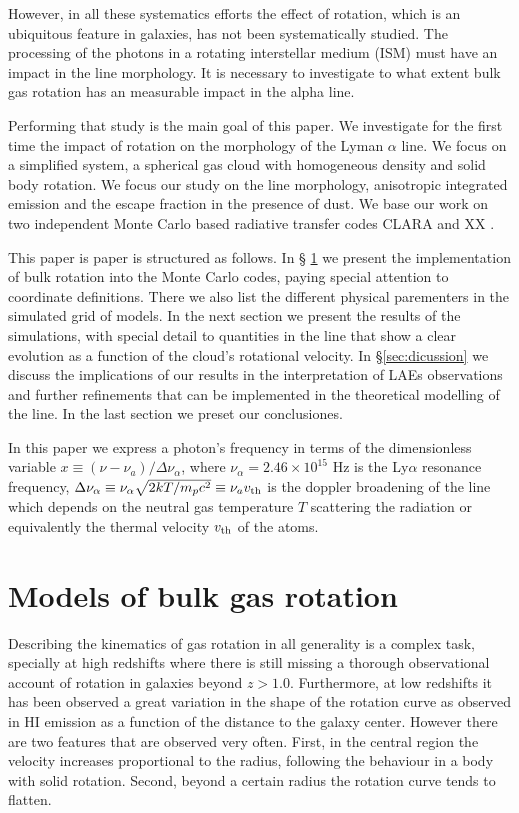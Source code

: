 \documentclass[usenatbib]{mn2e}
\newcommand{\ly}{{\ifmmode{{\rm Ly}\alpha~}\else{Ly$\alpha$~}\fi}}
\begin{document}
However, in all these systematics efforts the effect of rotation,
which is an ubiquitous feature in galaxies, has not been
systematically studied. The processing of the \ly photons in a
rotating interstellar medium (ISM) must have an impact in the line
morphology. It is necessary to investigate to what extent bulk gas
rotation has an measurable impact in the \ly alpha line. 

Performing that study is the main goal of this paper. We investigate for the
first time the impact of rotation on the morphology of the Lyman
$\alpha$ line. We focus on a simplified system, a spherical gas cloud
with homogeneous density and solid body rotation. We focus our study
on the line morphology, anisotropic integrated emission and the escape
fraction in the presence of dust. We base our work on two independent
Monte Carlo based radiative transfer codes CLARA \citep{CLARA} and XX
\citep{DijkstraKramer} .   
  
 
This paper is paper is structured as follows. In \S
\ref{sec:implementation} we present the implementation of bulk
rotation into the Monte Carlo codes, paying special attention to coordinate
definitions. There we also list the different physical parementers in
the simulated grid of models. In the next section we present the
results of the simulations, with special detail to quantities in the
line that show a clear evolution as a function of the cloud's
rotational velocity. In \S \ref{sec:dicussion} we discuss the
implications of our results in the interpretation of LAEs
observations and further refinements that can be implemented in the
theoretical modelling of the \ly line. In the last section we preset
our conclusiones.  

In this paper we express a photon's frequency in terms of the
dimensionless variable $x\equiv (\nu -\nu_a)/\Delta\nu_\alpha$, where
$\nu_{\alpha}=2.46\times 10^{15}$ Hz is the Ly$\alpha$ resonance
frequency,  $\Delta\nu_{\alpha} \equiv
\nu_{\alpha}\sqrt{2kT/m_pc^2}\equiv \nu_av_{\rm th} $ is the doppler
broadening of the line which depends on the neutral gas temperature
$T$ scattering the radiation or equivalently the thermal velocity
$v_{\rm th}$ of the atoms. 


\section{Models of bulk gas rotation}
\label{sec:implementation}

Describing the kinematics of gas rotation in all generality is a
complex task, specially at high redshifts where there is still missing
a thorough observational account of rotation in galaxies beyond
$z>1.0$. Furthermore, at low redshifts it has been observed a great
variation in the shape of the rotation curve as observed in HI
emission as a function of the distance to the galaxy center. However
there are two features that are observed very often. First, in the
central region the velocity increases proportional to the radius,
following the behaviour in a body with solid rotation. Second, beyond
a certain radius the rotation curve tends to flatten. 
\end{document}
